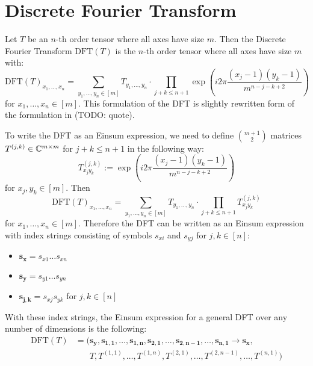 \section{Discrete Fourier Transform}
Let $T$ be an $n$-th order tensor where all axes have size $m$.
Then the Discrete Fourier Transform $\text{DFT}(T)$ is the $n$-th order tensor where all axes have size $m$ with:
$$\text{DFT}(T)_{x_1,\dots,x_n} = \sum\limits_{y_1,\dots,y_n \in [m]} T_{y_1, \dots, y_n} \cdot \prod\limits_{j + k \leq n + 1} \exp(i2\pi \frac{(x_j - 1) (y_k - 1)}{m^{n - j - k + 2}})$$
for $x_1,\dots,x_n \in [m]$.
This formulation of the DFT is slightly rewritten form of the formulation in (TODO: quote).

To write the DFT as an Einsum expression, we need to define $\binom{m + 1}{2}$ matrices $T^{(j,k)} \in \mathbb{C}^{m \times m}$ for $j + k \leq n + 1$ in the following way:
$$T^{(j,k)}_{x_j y_k} := \exp\left(i2\pi \frac{(x_j - 1) (y_k - 1)}{m^{n - j - k + 2}}\right)$$
for $x_j, y_k \in [m]$.
Then
$$\text{DFT}(T)_{x_1,\dots,x_n} = \sum\limits_{y_1,\dots,y_n \in [m]} T_{y_1, \dots, y_n} \cdot \prod\limits_{j + k \leq n + 1} T^{(j,k)}_{x_j y_k}$$
for $x_1,\dots,x_n \in [m]$.
Therefore the DFT can be written as an Einsum expression with index strings consisting of symbols $s_{xi}$ and $s_{yj}$ for $j,k \in [n]$:
\begin{itemize}
    \item $\bm{s_x} = s_{x1}\dots s_{x n}$
    \item $\bm{s_y} = s_{y1}\dots s_{y n}$
    \item $\bm{s_{j,k}} = s_{xj} s_{yk}$ for $j,k \in [n]$
\end{itemize}
With these index strings, the Einsum expression for a general DFT over any number of dimensions is the following:
\begin{align*}
    \text{DFT}(T) & = (\bm{s_y}, \bm{s_{1,1}}, \dots, \bm{s_{1,n}}, \bm{s_{2,1}}, \dots, \bm{s_{2,n - 1}}, \dots, \bm{s_{n, 1}} \rightarrow \bm{s_x}, \\
                  & \phantom{{}=(} T, T^{(1,1)}, \dots, T^{(1, n)}, T^{(2,1)}, \dots, T^{(2, n-1)}, \dots, T^{(n, 1)})
\end{align*}

